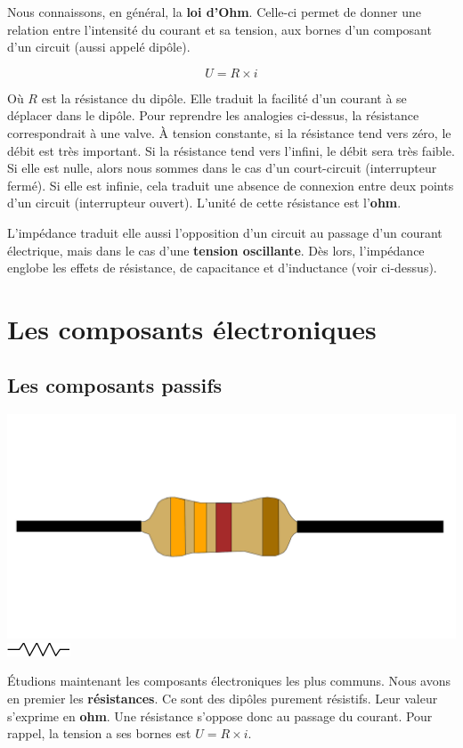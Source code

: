 \documentclass[
]{book}
\begin{document}
Nous connaissons, en général, la \textbf{loi d'Ohm}. Celle-ci permet de donner une relation entre l'intensité du courant et sa tension, aux bornes d'un composant d'un circuit (aussi appelé dipôle).

\[ U = R \times i \]

Où \(R\) est la résistance du dipôle. Elle traduit la facilité d'un courant à se déplacer dans le dipôle. Pour reprendre les analogies ci-dessus, la résistance correspondrait à une valve. À tension constante, si la résistance tend vers zéro, le débit est très important. Si la résistance tend vers l'infini, le débit sera très faible. Si elle est nulle, alors nous sommes dans le cas d'un court-circuit (interrupteur fermé). Si elle est infinie, cela traduit une absence de connexion entre deux points d'un circuit (interrupteur ouvert). L'unité de cette résistance est l'\textbf{ohm}.

L'impédance traduit elle aussi l'opposition d'un circuit au passage d'un courant électrique, mais dans le cas d'une \textbf{tension oscillante}. Dès lors, l'impédance englobe les effets de résistance, de capacitance et d'inductance (voir ci-dessus).

\hypertarget{les-composants-uxe9lectroniques}{%
\section{Les composants électroniques}\label{les-composants-uxe9lectroniques}}

\hypertarget{les-composants-passifs}{%
\subsection{Les composants passifs}\label{les-composants-passifs}}

\includegraphics[width=0.25\linewidth]{_resources/diagrams/resistor} \includegraphics[width=0.25\linewidth]{_resources/diagrams/resistor_sym}

Étudions maintenant les composants électroniques les plus communs. Nous avons en premier les \textbf{résistances}. Ce sont des dipôles purement résistifs. Leur valeur s'exprime en \textbf{ohm}. Une résistance s'oppose donc au passage du courant. Pour rappel, la tension a ses bornes est \(U = R \times i\).
\end{document}
